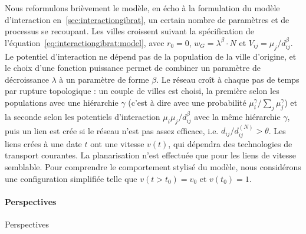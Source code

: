 Nous reformulons brièvement le modèle, en écho à la formulation du modèle d'interaction en~\ref{sec:interactiongibrat}, un certain nombre de paramètres et de processus se recoupant. Les villes croissent suivant la spécification de l'équation~\ref{eq:interactiongibrat:model}, avec $r_0 = 0$, $w_G = \lambda^\beta \cdot N$ et $V_{ij} = \mu_j / d_{ij}^\beta$. Le potentiel d'interaction ne dépend pas de la population de la ville d'origine, et le choix d'une fonction puissance permet de combiner un paramètre de décroissance $\lambda$ à un paramètre de forme $\beta$. Le réseau croît à chaque pas de temps par rupture topologique : un couple de villes est choisi, la première selon les populations avec une hiérarchie $\gamma$ (c'est à dire avec une probabilité $\mu_i^\gamma / \sum_j \mu_j^\gamma$) et la seconde selon les potentiels d'interaction $\mu_i \mu_j / d_{ij}^\beta$ avec la même hiérarchie $\gamma$, puis un lien est crée si le réseau n'est pas assez efficace, i.e. $d_{ij}/d^{(N)}_{ij}> \theta$. Les liens crées à une date $t$ ont une vitesse $v(t)$, qui dépendra des technologies de transport courantes. La planarisation n'est effectuée que pour les liens de vitesse semblable. Pour comprendre le comportement stylisé du modèle, nous considérons une configuration simplifiée telle que $v(t > t_0) = v_0$ et $v(t_0) = 1$.


\paragraph{Perspectives}{Perspectives}


